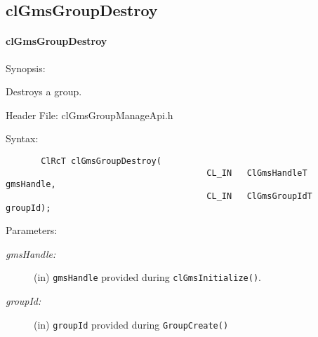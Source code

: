 \begin{flushleft}
  \newpage
  \subsection{clGmsGroupDestroy}
  \hypertarget{pagegms111}{}\paragraph{cl\-Gms\-Group\-Destroy}\label{pagegms111}
  \begin{Desc}

  \item[Synopsis:]

  Destroys a group.  \end{Desc}

  \begin{Desc}
    \item[Header File:]
    clGmsGroupManageApi.h\end{Desc}

    \begin{Desc}
    \item[Syntax:]
    \footnotesize\begin{verbatim}       ClRcT clGmsGroupDestroy(
                            			CL_IN   ClGmsHandleT                    gmsHandle,
                            			CL_IN   ClGmsGroupIdT                   groupId);

   \end{verbatim}
    \normalsize
    \end{Desc}

   \begin{Desc}
  \item[Parameters:]
  \begin{description}
    \item[{\em gmsHandle:}] (in) {\tt{gmsHandle}} provided during {\tt{clGmsInitialize()}}.
   \item[{\em groupId:}] (in) {\tt{groupId}} provided during {\tt{GroupCreate()}}
   \end{description}
   \end{Desc}


\end{flushleft}
